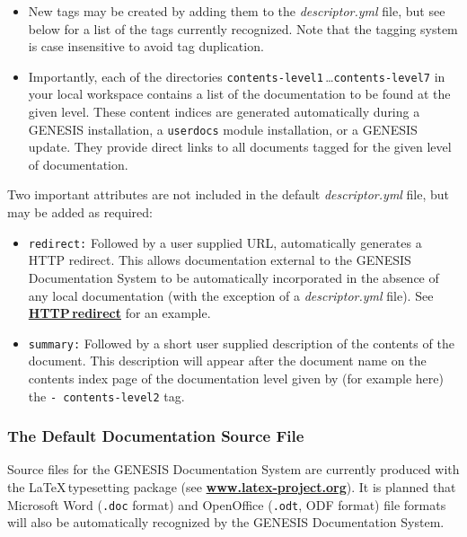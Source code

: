 \documentclass[12pt]{article}
\begin{document}
\begin{itemize}
\begin{itemize}
   \item New tags may be created by adding them to the {\it descriptor.yml} file, but see below for a list of the tags currently recognized.  Note that the tagging system is case insensitive to avoid tag duplication.

   \item Importantly, each of the directories {\tt contents-level1}\,\ldots {\tt contents-level7} in your local workspace contains a list of the documentation to be found at the given level. These content indices are generated automatically during a GENESIS installation, a {\tt userdocs} module installation, or a GENESIS update. They provide direct links to all documents tagged for the given level of documentation.
\end{itemize}   
\end{itemize}
Two important attributes are not included in the default {\it descriptor.yml} file, but may be added as required:
\begin{itemize}
\item {\tt redirect:} Followed by a user supplied URL, automatically generates a HTTP redirect. This allows documentation external to the GENESIS Documentation System to be automatically incorporated in the absence of any local documentation (with the exception of a {\it descriptor.yml} file). See \href{../http-redirect/http-redirect.tex}{\bf HTTP\,redirect} for an example.
\item {\tt summary:} Followed by a short user supplied description of the contents of the document. This description will appear after the document name on the contents index page of the documentation level given by (for example here) the {\tt -\,contents-level2} tag.

\end{itemize}

\subsubsection*{The Default Documentation Source File}

Source files for the GENESIS Documentation System are currently produced with the \LaTeX\,typesetting package (see \href{http://www.latex-project.org/}{\bf www.latex-project.org}). It is planned that Microsoft Word ({\tt .doc} format) and OpenOffice ({\tt .odt}, ODF format) file formats will also be automatically recognized by the GENESIS Documentation System.
\end{document}

